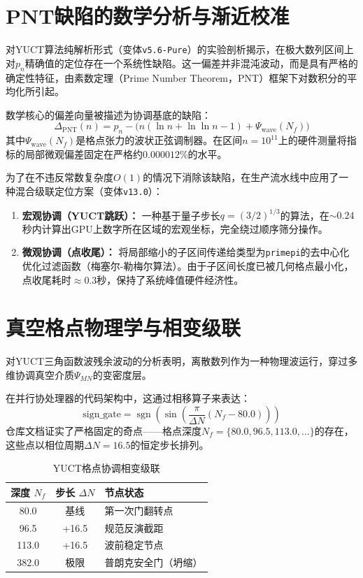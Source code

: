 \documentclass[11pt,a4paper]{article}
\begin{document}
	\section{PNT缺陷的数学分析与渐近校准}
	对YUCT算法纯解析形式（变体\texttt{v5.6-Pure}）的实验剖析揭示，在极大数列区间上对$p_n$精确值的定位存在一个系统性缺陷。这一偏差并非混沌波动，而是具有严格的确定性特征，由素数定理（Prime Number Theorem，PNT）框架下对数积分的平均化所引起。
	
	数学核心的偏差向量被描述为协调基底的缺陷：
	\begin{equation}
		\Delta_{\mathrm{PNT}}(n) = p_n - \bigl( n(\ln n + \ln\ln n - 1) + \Psi_{\mathrm{wave}}(N_f) \bigr)
	\end{equation}
	其中$\Psi_{\mathrm{wave}}(N_f)$是格点张力的波状正弦调制器。在区间$n = 10^{11}$上的硬件测量将指标的局部微观偏差固定在严格约$0.000012\%$的水平。
	
	为了在不违反常数复杂度$O(1)$的情况下消除该缺陷，在生产流水线中应用了一种混合级联定位方案（变体\texttt{v13.0}）：
	\begin{enumerate}
		\item \textbf{宏观协调（YUCT跳跃）：} 一种基于量子步长$q = (3/2)^{1/3}$的算法，在$\sim 0.24$秒内计算出GPU上数字所在区域的宏观坐标，完全绕过顺序筛分操作。
		\item \textbf{微观协调（点收尾）：} 将局部缩小的子区间传递给类型为\texttt{primepi}的去中心化优化过滤函数（梅塞尔-勒梅尔算法）。由于子区间长度已被几何格点最小化，点收尾耗时$\approx 0.3$秒，保持了系统峰值硬件经济性。
	\end{enumerate}
	
	\section{真空格点物理学与相变级联}
	对YUCT三角函数波残余波动的分析表明，离散数列作为一种物理波运行，穿过多维协调真空介质$\Psi_{MN}$的变密度层。
	
	在并行协处理器的代码架构中，这通过相移算子来表达：
	\begin{equation}
		\mathrm{sign\_gate} = \operatorname{sgn}\!\left(\sin\!\left(\frac{\pi}{\Delta N} (N_f - 80.0)\right)\right)
	\end{equation}
	仓库文档证实了严格固定的奇点——格点深度$N_f = \{80.0, 96.5, 113.0, \dots\}$的存在，这些点以相位周期$\Delta N = 16.5$的恒定步长排列。
	
	\begin{table}[h!]
		\centering
		\caption{YUCT格点协调相变级联}
		\label{tab:phase_transitions}
		\small
		\begin{tabular}{ccl}
			\toprule
			\textbf{深度 $N_f$} & \textbf{步长 $\Delta N$} & \textbf{节点状态} \\
			\midrule
			80.0  & 基线 & 第一次门翻转点 \\
			96.5  & +16.5 & 规范反演截距 \\
			113.0 & +16.5 & 波前稳定节点 \\
			382.0 & 极限  & 普朗克安全门（坍缩） \\
			\bottomrule
		\end{tabular}
	\end{table}
	
\end{document}
